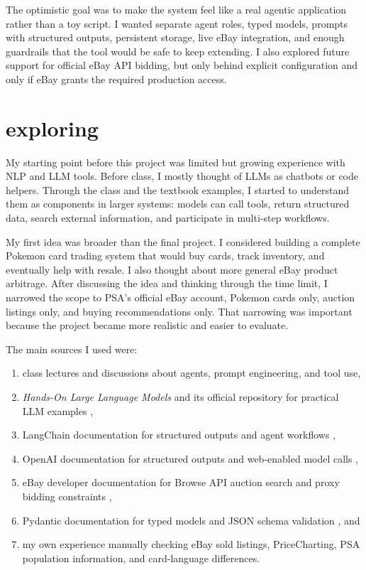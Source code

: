 \documentclass[10pt,twocolumn]{article}
\begin{document}
The optimistic goal was to make the system feel like a real agentic application rather than a toy script. I wanted separate agent roles, typed models, prompts with structured outputs, persistent storage, live eBay integration, and enough guardrails that the tool would be safe to keep extending. I also explored future support for official eBay API bidding, but only behind explicit configuration and only if eBay grants the required production access.

\section{exploring}

My starting point before this project was limited but growing experience with NLP and LLM tools. Before class, I mostly thought of LLMs as chatbots or code helpers. Through the class and the textbook examples, I started to understand them as components in larger systems: models can call tools, return structured data, search external information, and participate in multi-step workflows.

My first idea was broader than the final project. I considered building a complete Pokemon card trading system that would buy cards, track inventory, and eventually help with resale. I also thought about more general eBay product arbitrage. After discussing the idea and thinking through the time limit, I narrowed the scope to PSA's official eBay account, Pokemon cards only, auction listings only, and buying recommendations only. That narrowing was important because the project became more realistic and easier to evaluate.

The main sources I used were:
\begin{enumerate}[leftmargin=*]
    \item class lectures and discussions about agents, prompt engineering, and tool use,
    \item \textit{Hands-On Large Language Models} and its official repository for practical LLM examples \cite{handsonllm},
    \item LangChain documentation for structured outputs and agent workflows \cite{langchainstructured},
    \item OpenAI documentation for structured outputs and web-enabled model calls \cite{openaistructured},
    \item eBay developer documentation for Browse API auction search and proxy bidding constraints \cite{ebaybrowse,ebayproxybid},
    \item Pydantic documentation for typed models and JSON schema validation \cite{pydanticjsonschema}, and
    \item my own experience manually checking eBay sold listings, PriceCharting, PSA population information, and card-language differences.
\end{enumerate}
\end{document}
